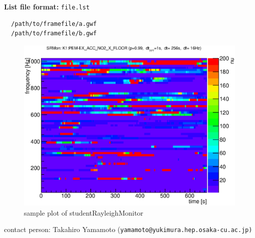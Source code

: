{\noindent \bf List file format:} {\tt file.lst}
{\footnotesize
\begin{verbatim}
  /path/to/framefile/a.gwf
  /path/to/framefile/b.gwf

\end{verbatim}
}

\begin{figure}[t]
  \begin{center}
    \includegraphics[width=0.9\hsize]{fig/StudentRayleighMon/sample1.eps}
    \caption{sample plot of studentRayleighMonitor}
  \end{center}
\end{figure}

{\noindent \small contact person: Takahiro Yamamoto (\tt yamamoto@yukimura.hep.osaka-cu.ac.jp)}

